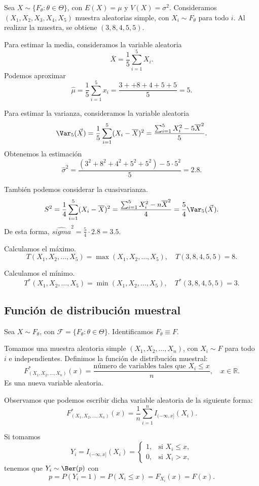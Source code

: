 \begin{example}
    Sea $X \sim \{F_\theta : \theta \in \Theta\}$, con $E(X) = \mu$ y $V(X) = \sigma^2$.
    Consideramos $(X_1, X_2, X_3, X_4, X_5)$ muestra aleatorias simple, con $X_i \sim F_\theta$ para todo $i$.
    Al realizar la muestra, se obtiene $(3, 8, 4, 5, 5)$.

    Para estimar la media, consideramos la variable aleatoria
    $$\overline{X} = \frac{1}{5} \sum_{i=1}^5 X_i.$$
    Podemos aproximar
    $$\hat{\mu} = \frac{1}{5} \sum_{i=1}^5 x_i = \frac{3++8+4+5+5}{5} = 5.$$

    Para estimar la varianza, consideramos la variable aleatoria
    $$\Var_5(\vec{X}) = \frac{1}{5} \sum_{i=1}^5 (X_i - \overline{X})^2 = \frac{\sum_{i=1}^5 X_i^2 - 5\overline{X}^2}{5}.$$
    Obtenemos la estimación
    $$\hat{\sigma}^2 = \frac{(3^2+8^2+4^2+5^2+5^2) - 5 \cdot 5^2}{5} = 2.8.$$

    También podemos considerar la cuasivarianza.
    $$S^2 = \frac{1}{4} \sum_{i=1}^5 (X_i - \overline{X})^2 = \frac{\sum_{i=1}^5 X_i^2 - n\overline{X}^2}{4} = \frac{5}{4} \Var_5(\vec{X}).$$
    De esta forma, $\hat{sigma}^2 = \frac{5}{4} \cdot 2.8 = 3.5$.

    Calculamos el máximo.
    $$T(X_1, X_2, \dots, X_5) = \max(X_1, X_2, \dots, X_5), \quad T(3, 8, 4, 5, 5) = 8.$$

    Calculamos el mínimo.
    $$T^\ast(X_1, X_2, \dots, X_5) = \min(X_1, X_2, \dots, X_5), \quad T^\ast(3, 8, 4, 5, 5) = 3.$$
\end{example}

\subsection{Función de distribución muestral}

Sea $X \sim F_{\theta}$, con $\mathcal{F} = \{F_{\theta} : \theta \in \Theta\}$.
Identificamos $F_{\theta} \equiv F$.

Tomamos una muestra aleatoria simple $(X_1, X_2, \dots, X_n)$, con $X_i \sim F$ para todo $i$ e independientes.
Definimos la función de distribución muestral:
$$F_{(X_1, X_2, \dots, X_n)}^\ast(x) = \frac{\text{número de variables tales que } X_i \leq x}{n}, \quad x \in \mathbb{R}.$$
Es una nueva variable aleatoria.

Observamos que podemos escribir dicha variable aleatoria de la siguiente forma:
$$F_{(X_1, X_2, \dots, X_n)}^\ast(x) = \frac{1}{n} \sum_{i=1}^{n} I_{(-\infty, x]}(X_i).$$

Si tomamos
$$Y_i = I_{(-\infty, x]}(X_i) = \begin{cases}
    1, & \text{si } X_i \leq x, \\
    0, & \text{si } X_i > x,
\end{cases}$$
tenemos que $Y_i \sim \Ber(p)$ con
$$p = P(Y_i = 1) = P(X_i \leq x) = F_{X_i}(x) = F(x).$$

